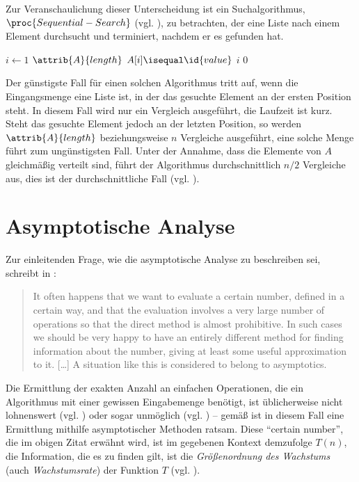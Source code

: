 Zur Veranschaulichung dieser Unterscheidung ist ein Suchalgorithmus, $\proc{Sequential-Search}$ (vgl. \cite[396]{taocp3}), zu betrachten, der eine Liste nach einem Element durchsucht und terminiert, nachdem er es gefunden hat.

\begin{codebox}
    \li \For $i \gets 1$ \To $\attrib{A}{length}$
    \li     \Do
                \If $A[i] \isequal \id{value}$
    \li             \Then
                        \Return $i$
                    \End
            \End
    \li \Return $0$
\end{codebox}

Der günstigste Fall für einen solchen Algorithmus tritt auf, wenn die Eingangsmenge eine Liste ist, in der das gesuchte Element an der ersten Position steht. In diesem Fall wird nur ein Vergleich ausgeführt, die Laufzeit ist kurz. Steht das gesuchte Element jedoch an der letzten Position, so werden $\attrib{A}{length}$ beziehungsweise $n$ Vergleiche ausgeführt, eine solche Menge führt zum ungünstigsten Fall. Unter der Annahme, dass die Elemente von $A$ gleichmäßig verteilt sind, führt der Algorithmus durchschnittlich $n/2$ Vergleiche aus, dies ist der durchschnittliche Fall (vgl. \cite[59]{sha2011}).

\section{Asymptotische Analyse}
\label{sec:asymptotic-analysis}

Zur einleitenden Frage, wie die asymptotische Analyse zu beschreiben sei, schreibt \citeauthor{bru1958} in :

\blockquote[{\cite[1]{bru1958}}]{It often happens that we want to evaluate a certain number, defined in a certain way, and that the evaluation involves a very large number of operations so that the direct method is almost prohibitive. In such cases we should be very happy to have an entirely different method for finding information about the number, giving at least some useful approximation to it. [\ldots] A situation like this is considered to belong to asymptotics.}

Die Ermittlung der exakten Anzahl an einfachen Operationen, die ein Algorithmus mit einer gewissen Eingabemenge benötigt, ist üblicherweise nicht lohnenswert (vgl. \cite[28]{hsr1997}) oder sogar unmöglich (vgl. \cite[37]{meh1984}) -- gemäß \citeauthor{bru1958} ist in diesem Fall eine Ermittlung mithilfe asymptotischer Methoden ratsam. Diese \enquote{certain number}, die im obigen Zitat erwähnt wird, ist im gegebenen Kontext demzufolge $T(n)$, die Information, die es zu finden gilt, ist die \emph{Größenordnung des Wachstums} (auch \emph{Wachstumsrate}) der Funktion $T$ (vgl. \cite[63]{sha2011}).

